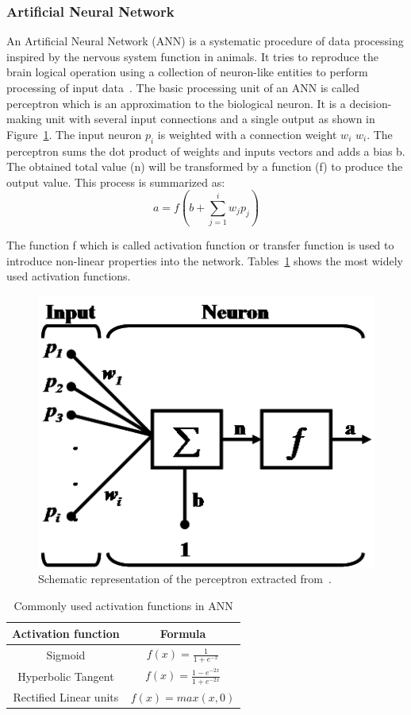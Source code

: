 \subsubsection{Artificial Neural Network}
An Artificial Neural Network (ANN) is a systematic procedure of data processing inspired by the nervous system function in animals. It tries to reproduce the brain logical operation using a collection of neuron-like entities to perform processing of input data~\cite{cortina2010analysis}. The basic processing unit of an ANN is called perceptron which is an approximation to the biological neuron. It is a decision-making unit with several input connections and a single output as shown in Figure~\ref{fig:perceptron}. The
input neuron $p_i$ is weighted with a connection weight $w_i$  $w_i$. The perceptron sums the dot product of weights and inputs vectors and adds a bias b. The obtained total value (n) will be
transformed by a function (f) to produce the output value. This process is summarized as:
\begin{equation}
    a= f(b+ \sum_{j=1}^{i}{w_j p_j})
\end{equation}{}


The function f which is called activation function or transfer function is used to introduce non-linear properties into the network. Tables~\ref{tab:activation_func} shows the most widely used activation functions. 



\begin{figure}[h]
    \centering
    \includegraphics[width=.5\textwidth]{Figures/perceptron.png}
    \caption{Schematic representation of the perceptron extracted from~\cite{cortina2010analysis}.}
    \label{fig:perceptron}
\end{figure}



\begin{table}[h]
    \centering
\begin{tabular}{|c|c|}
\hline 
Activation function & Formula \tabularnewline
\hline 
Sigmoid & $f(x)= \frac{1}{1+ e^{-x}}$\tabularnewline
\hline 
Hyperbolic Tangent & $f(x)= \frac{1-e^{-2x}}{1+e^{-2x}}$\tabularnewline
\hline 
Rectified Linear units & $f(x)= max(x,0)$\tabularnewline
\hline 
\end{tabular}
    \caption{Commonly used activation functions in ANN}
    \label{tab:activation_func}
\end{table}


